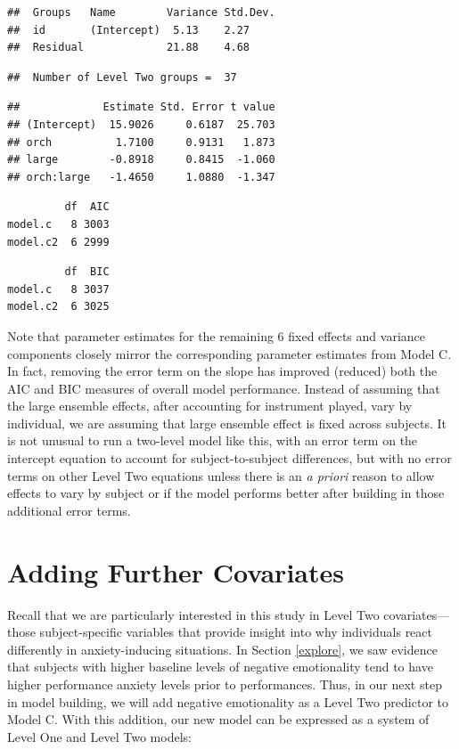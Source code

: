 \documentclass[
]{krantz}
\begin{document}
\begin{verbatim}
##  Groups   Name        Variance Std.Dev.
##  id       (Intercept)  5.13    2.27    
##  Residual             21.88    4.68
\end{verbatim}

\begin{verbatim}
##  Number of Level Two groups =  37
\end{verbatim}

\begin{verbatim}
##             Estimate Std. Error t value
## (Intercept)  15.9026     0.6187  25.703
## orch          1.7100     0.9131   1.873
## large        -0.8918     0.8415  -1.060
## orch:large   -1.4650     1.0880  -1.347
\end{verbatim}

\begin{verbatim}
         df  AIC
model.c   8 3003
model.c2  6 2999
\end{verbatim}

\begin{verbatim}
         df  BIC
model.c   8 3037
model.c2  6 3025
\end{verbatim}

Note that parameter estimates for the remaining 6 fixed effects and variance components closely mirror the corresponding parameter estimates from Model C. In fact, removing the error term on the slope has improved (reduced) both the AIC and BIC measures of overall model performance. Instead of assuming that the large ensemble effects, after accounting for instrument played, vary by individual, we are assuming that large ensemble effect is fixed across subjects. It is not unusual to run a two-level model like this, with an error term on the intercept equation to account for subject-to-subject differences, but with no error terms on other Level Two equations unless there is an \emph{a priori} reason to allow effects to vary by subject or if the model performs better after building in those additional error terms.

\section{Adding Further Covariates}\label{sec:modeld}

Recall that we are particularly interested in this study in Level Two covariates---those subject-specific variables that provide insight into why individuals react differently in anxiety-inducing situations. In Section \ref{explore}, we saw evidence that subjects with higher baseline levels of negative emotionality tend to have higher performance anxiety levels prior to performances. Thus, in our next step in model building, we will add negative emotionality as a Level Two predictor to Model C. With this addition, our new model can be expressed as a system of Level One and Level Two models:
\end{document}
